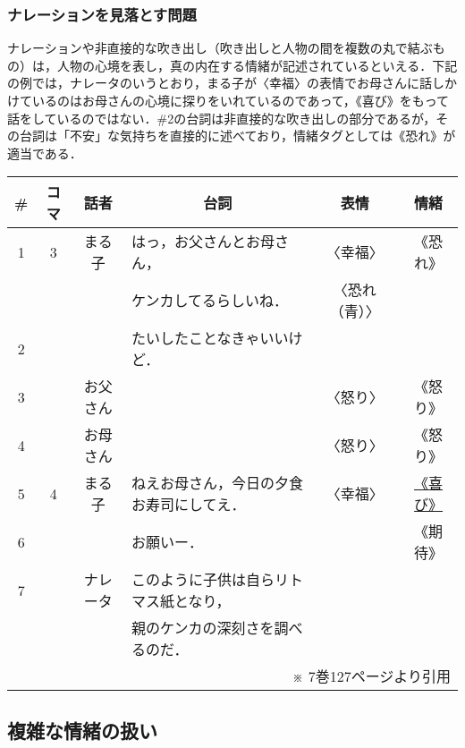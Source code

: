 \documentclass[japanese]{jnlp_1.3c}
\begin{document}
    \subsubsection{ナレーションを見落とす問題}

ナレーションや非直接的な吹き出し（吹き出しと人物の間を複数の丸で結ぶもの）は，人物の心境を表し，真の内在する情緒が記述されているといえる．下記の例では，ナレータのいうとおり，まる子が〈幸福〉の表情でお母さんに話しかけているのはお母さんの心境に探りをいれているのであって，《喜び》をもって話をしているのではない．\#2の台詞は非直接的な吹き出しの部分であるが，その台詞は「不安」な気持ちを直接的に述べており，情緒タグとしては《恐れ》が適当である．

\vspace{\baselineskip}
\begin{center}
\setlength{\tabcolsep}{3pt}
\begin{tabular}{|c|c|c|l|c|c|}
\hline
\# & コマ & 話者 & \multicolumn{1}{|c|}{台詞} & 表情 & 情緒 \\
\hline
1 & 3 &まる子  &はっ，お父さんとお母さん，                  &〈幸福〉      &《恐れ》\\
  &   &        &ケンカしてるらしいね．                      &〈恐れ（青）〉&\\
\cline{1-1} \cline{4-4}
2 &   &        &たいしたことなきゃいいけど．                &              &\\
\cline{1-1} \cline{3-6}
3 &   &お父さん&                                            &〈怒り〉      &《怒り》\\
\cline{1-1} \cline{3-6}
4 &   &お母さん&                                            &〈怒り〉      &《怒り》\\
\hline
5 & 4 &まる子  &ねえお母さん，今日の夕食お寿司にしてえ．    &〈幸福〉      &\underline{《喜び》}\\
\cline{1-1} \cline{4-4}
6 &   &        &お願いー．                                  &              &《期待》\\
\cline{1-1} \cline{3-6}
7 &   &ナレータ&このように子供は自らリトマス紙となり，  &              &\\
  &   &        &親のケンカの深刻さを調べるのだ．        &              &\\
\hline
\multicolumn{6}{r}{※ 7巻127ページより引用}
\end{tabular}
\end{center}



\subsection{複雑な情緒の扱い} \label{sec6.2}
\end{document}
